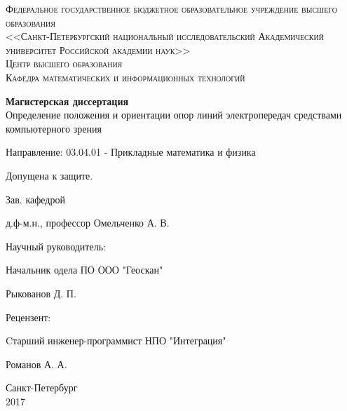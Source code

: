 \documentclass[12pt]{report}
\begin{document}
\begin{titlepage}
\begin{center}


\textsc{ Федеральное государственное бюджетное
образовательное учреждение высшего образования \\
<<Санкт-Петербургский национальный исследовательский
Академический университет Российской академии наук>>
}\\
\textsc{ Центр высшего образования}\\
\vspace{0.5cm}
\textsc{Кафедра математических и информационных технологий}\\[1cm]
\end{center}

\newcommand{\HRule}{\rule{\linewidth}{0.5mm}}
\newcommand{\summary}[1]{\addcontentsline{toc}{subsubsection}{#1}}

\begin{center}

\vspace{2cm}
\huge \textbf{Магистерская диссертация}\\[0.5cm]
\LARGE Определение положения и ориентации опор линий электропередач средствами компьютерного зрения \\[0.4cm] 

\vspace{1cm}

\normalsize
Направление: 03.04.01 - Прикладные математика и физика 
\end{center}

\vspace{0.5cm}

\begin{flushright}
\large Допущена к защите.

Зав. кафедрой

д.ф-м.н., профессор Омельченко А. В.


\vspace{1cm}


\large Научный руководитель:

Начальник одела ПО ООО "Геоскан"

Рыкованов Д. П.


\vspace{1cm}

\large Рецензент:

Cтарший инженер-программист НПО "Интеграция"

Романов А. А.

\end{flushright}
\vfill

\begin{center}

{Санкт-Петербург\\2017}

\end{center}
\end{titlepage}
\end{document}
